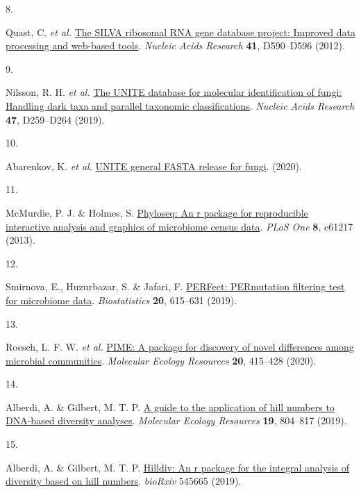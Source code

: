 \documentclass[
  10pt,
  letterpaper,
  DIV=11,
  numbers=noendperiod]{scrartcl}
\newlength{\cslhangindent}
\newlength{\csllabelwidth}
\newlength{\cslentryspacingunit} %
\newenvironment{CSLReferences}[2] %
 {%
  \setlength{\parindent}{0pt}
  \ifodd #1
  \let\oldpar\par
  \def\par{\hangindent=\cslhangindent\oldpar}
  \fi
  \setlength{\parskip}{#2\cslentryspacingunit}
 }%
 {}
\newcommand{\CSLLeftMargin}[1]{\parbox[t]{\csllabelwidth}{#1}}
\newcommand{\CSLRightInline}[1]{\parbox[t]{\linewidth - \csllabelwidth}{#1}\break}
\begin{document}
\begin{CSLReferences}{0}{0}
\leavevmode{}%
\CSLLeftMargin{8. }%
\CSLRightInline{Quast, C. \emph{et al.}
\href{https://doi.org/10.1093/nar/gks1219}{The SILVA ribosomal RNA gene
database project: Improved data processing and web-based tools}.
\emph{Nucleic Acids Research} \textbf{41}, D590--D596 (2012).}

\leavevmode{}%
\CSLLeftMargin{9. }%
\CSLRightInline{Nilsson, R. H. \emph{et al.}
\href{https://doi.org/10.1093/nar/gky1022}{The UNITE database for
molecular identification of fungi: Handling dark taxa and parallel
taxonomic classifications}. \emph{Nucleic Acids Research} \textbf{47},
D259--D264 (2019).}

\leavevmode{}%
\CSLLeftMargin{10. }%
\CSLRightInline{Abarenkov, K. \emph{et al.}
\href{https://dx.doi.org/10.15156/BIO/786368}{UNITE general FASTA
release for fungi}. (2020).}

\leavevmode{}%
\CSLLeftMargin{11. }%
\CSLRightInline{McMurdie, P. J. \& Holmes, S.
\href{https://doi.org/10.1371/journal.pone.0061217}{Phyloseq: An r
package for reproducible interactive analysis and graphics of microbiome
census data}. \emph{PLoS One} \textbf{8}, e61217 (2013).}

\leavevmode{}%
\CSLLeftMargin{12. }%
\CSLRightInline{Smirnova, E., Huzurbazar, S. \& Jafari, F.
\href{https://doi.org/10.1093/biostatistics/kxy020}{PERFect: PERmutation
filtering test for microbiome data}. \emph{Biostatistics} \textbf{20},
615--631 (2019).}

\leavevmode{}%
\CSLLeftMargin{13. }%
\CSLRightInline{Roesch, L. F. W. \emph{et al.}
\href{https://doi.org/10.1111/1755-0998.13116}{PIME: A package for
discovery of novel differences among microbial communities}.
\emph{Molecular Ecology Resources} \textbf{20}, 415--428 (2020).}

\leavevmode{}%
\CSLLeftMargin{14. }%
\CSLRightInline{Alberdi, A. \& Gilbert, M. T. P.
\href{https://doi.org/10.1111/1755‐0998.13014}{A guide to the
application of hill numbers to DNA-based diversity analyses}.
\emph{Molecular Ecology Resources} \textbf{19}, 804--817 (2019).}

\leavevmode{}%
\CSLLeftMargin{15. }%
\CSLRightInline{Alberdi, A. \& Gilbert, M. T. P.
\href{https://doi.org/10.1101/545665}{Hilldiv: An r package for the
integral analysis of diversity based on hill numbers}. \emph{bioRxiv}
545665 (2019).}


\end{CSLReferences}
\end{document}
